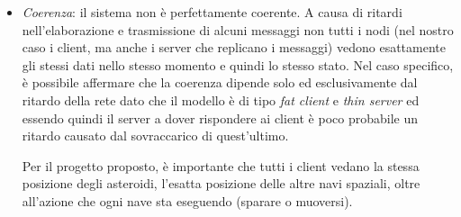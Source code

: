 \documentclass[paper=a4, fontsize=11pt]{scrartcl} %
\numberwithin{equation}{section} %
\numberwithin{figure}{section} %
\numberwithin{table}{section} %
\begin{document}
\begin{itemize}
\item \textit{Coerenza}: il sistema non è perfettamente coerente. A causa di ritardi nell'elaborazione e trasmissione di alcuni messaggi non tutti i nodi (nel nostro caso i client, ma anche i server che replicano i messaggi) vedono esattamente gli stessi dati nello stesso momento e quindi lo stesso stato. Nel caso specifico, è possibile affermare che la coerenza dipende solo ed esclusivamente dal ritardo della rete dato che il modello è di tipo \textit{fat client} e \textit{thin server} ed essendo quindi il server a dover rispondere ai client è poco probabile un ritardo causato dal sovraccarico di quest'ultimo.

Per il progetto proposto, è importante che tutti i client vedano la stessa posizione degli asteroidi, l'esatta posizione delle altre navi spaziali, oltre all'azione che ogni nave sta eseguendo (sparare o muoversi).


\end{itemize}
\end{document}

